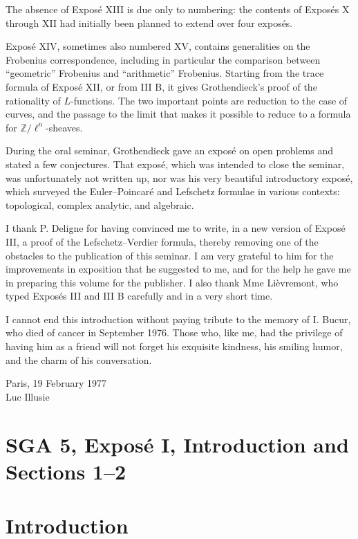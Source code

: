 \documentclass[11pt]{article}
\theoremstyle{plain}
\theoremstyle{definition}
\theoremstyle{remark}
\newcommand{\Z}{\mathbb Z}\newcommand{\Q}{\mathbb Q}\newcommand{\N}{\mathbb N}\newcommand{\A}{\mathbb A}\newcommand{\Pp}{\mathbb P}
\begin{document}
The absence of Exposé XIII is due only to numbering: the contents of Exposés X through XII had initially been planned to extend over four exposés.

Exposé XIV, sometimes also numbered XV, contains generalities on the Frobenius correspondence, including in particular the comparison between ``geometric'' Frobenius and ``arithmetic'' Frobenius. Starting from the trace formula of Exposé XII, or from III B, it gives Grothendieck's proof of the rationality of $L$-functions. The two important points are reduction to the case of curves, and the passage to the limit that makes it possible to reduce to a formula for $\Z/\ell^n$-sheaves.

During the oral seminar, Grothendieck gave an exposé on open problems and stated a few conjectures. That exposé, which was intended to close the seminar, was unfortunately not written up, nor was his very beautiful introductory exposé, which surveyed the Euler--Poincaré and Lefschetz formulae in various contexts: topological, complex analytic, and algebraic.

I thank P. Deligne for having convinced me to write, in a new version of Exposé III, a proof of the Lefschetz--Verdier formula, thereby removing one of the obstacles to the publication of this seminar. I am very grateful to him for the improvements in exposition that he suggested to me, and for the help he gave me in preparing this volume for the publisher. I also thank Mme Lièvremont, who typed Exposés III and III B carefully and in a very short time.

I cannot end this introduction without paying tribute to the memory of I. Bucur, who died of cancer in September 1976. Those who, like me, had the privilege of having him as a friend will not forget his exquisite kindness, his smiling humor, and the charm of his conversation.

\begin{flushright}
Paris, 19 February 1977\\
Luc Illusie
\end{flushright}

\bigskip


\clearpage
\section*{SGA 5, Exposé I, Introduction and Sections 1--2}

\section*{Introduction}
\end{document}
